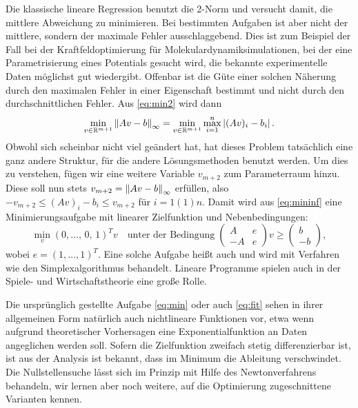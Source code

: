 Die klassische lineare Regression benutzt die 2-Norm und versucht
damit, die mittlere Abweichung zu minimieren. Bei bestimmten Aufgaben
ist aber nicht der mittlere, sondern der maximale Fehler
ausschlaggebend. Dies ist zum Beispiel der Fall bei der
Kraftfeldoptimierung für Molekulardynamiksimulationen, bei der eine
Parametrisierung eines Potentials gesucht wird, die bekannte
experimentelle Daten möglichst gut wiedergibt. Offenbar ist die Güte
einer solchen Näherung durch den maximalen Fehler in einer Eigenschaft
bestimmt und nicht durch den durchschnittlichen Fehler.  Aus
\eqref{eq:min2} wird dann
\begin{equation}
  \label{eq:mininf}
  \min_{v\in\mathbb{R}^{m+1}} \left\lVert{A v -
    b}\right\rVert_\infty = \min_{v\in\mathbb{R}^{m+1}} \max_{i=1}^n \left\lvert{(A v)_i - b_i}\right\rvert.
\end{equation}
Obwohl sich scheinbar nicht viel geändert hat, hat dieses Problem
tatsächlich eine ganz andere Struktur, für die andere Lösungsmethoden
benutzt werden. Um dies zu verstehen, fügen wir eine weitere Variable
$v_{m+2}$ zum Parameterraum hinzu. Diese soll nun stets $v_{m+2} =
\left\lVert{A v - b}\right\rVert_\infty$ erfüllen, also $-v_{m+2}\le (A v)_i - b_i \le
v_{m+2}$ für $i=1(1)n$. Damit wird aus \eqref{eq:mininf} eine
Minimierungsaufgabe mit linearer Zielfunktion und Nebenbedingungen:
\begin{equation}
  \label{eq:chebyshevappr}
  \min_v (0,\ldots,\,0,\,1)^T v\quad\text{unter der Bedingung}\;
  \begin{pmatrix}
    A  & e\\
    -A & e
  \end{pmatrix} v \ge
  \begin{pmatrix}
    b\\
    -b
  \end{pmatrix},
\end{equation}
wobei $e=(1,\ldots,1)^T$. Eine solche Aufgabe heißt auch
\emph{} und wird mit Verfahren wie den
Simplexalgorithmus behandelt. Lineare Programme spielen auch in der
Spiele- und Wirtschaftstheorie eine große Rolle.

Die ursprünglich gestellte Aufgabe \eqref{eq:min} oder auch
\eqref{eq:fit} sehen in ihrer allgemeinen Form natürlich auch
nichtlineare Funktionen vor, etwa wenn aufgrund theoretischer
Vorhersagen eine Exponentialfunktion an Daten angeglichen werden soll.
Sofern die Zielfunktion zweifach stetig differenzierbar ist, ist aus
der Analysis ist bekannt, dass im Minimum die Ableitung
verschwindet. Die Nullstellensuche lässt sich im Prinzip mit Hilfe des
Newtonverfahrens behandeln, wir lernen aber noch weitere, auf die
Optimierung zugeschnittene Varianten kennen.

